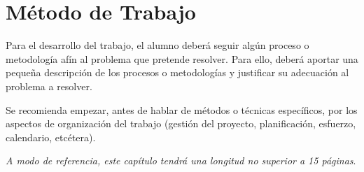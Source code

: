 \chapter{Método de Trabajo}
\label{chap:metodologia}

\noindent
Para el desarrollo del trabajo, el alumno deberá seguir algún proceso o
metodología afín al problema que pretende resolver. Para ello, deberá aportar
una pequeña descripción de los procesos o metodologías y justificar su
adecuación al problema a resolver.

Se recomienda empezar, antes de hablar de métodos o técnicas específicos, por
los aspectos de organización del trabajo (gestión del proyecto, planificación,
esfuerzo, calendario, etcétera).

\emph{A modo de referencia, este capítulo tendrá una longitud no superior a 15
  páginas}.
